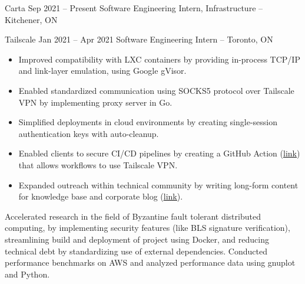 \documentclass{article}
\begin{document}
\normalsize
\WorkEntry
{Carta}
{Sep 2021 -- Present}
{Software Engineering Intern, Infrastructure -- Kitchener, ON}
{
}
\iffalse
Made Tailscale ready for the cloud, by creating features that allowed it to run in lightweight, unprivileged container environments. This included a virtual networking stack for connecting to the Tailscale network without kernel privileges to create a network driver, a SOCKS5 proxy to allow applications to communicate over this virtual networking stack, and ephemeral authentication keys for stateless access to the Tailscale network. Also published long-form technical content on company blog (https://tailscale.com/blog/2021-05-github-actions-and-tailscale/) and contributed to product knowledge base.
\fi
\WorkEntry
{Tailscale}
{Jan 2021 -- Apr 2021}
{Software Engineering Intern -- Toronto, ON}
{\begin{itemize} \itemsep -1pt
    \item Improved compatibility with LXC containers by providing in-process TCP/IP and link-layer emulation, using Google gVisor.
    \item Enabled standardized communication using SOCKS5 protocol over Tailscale VPN by implementing proxy server in Go.
    \item Simplified deployments in cloud environments by creating single-session authentication keys with auto-cleanup.
    \item Enabled clients to secure CI/CD pipelines by creating a GitHub Action (\underline{\href{https://github.com/tailscale/github-action}{link}}) that allows workflows to use Tailscale VPN. %
    \item Expanded outreach within technical community by writing long-form content for knowledge base and corporate blog (\underline{\href{https://tailscale.com/blog/2021-05-github-actions-and-tailscale/}{link}}).
    \end{itemize}}
\vspace{1mm}
\iffalse
Accelerated research in the field of Byzantine fault tolerant distributed computing, by implementing security features (like BLS signature verification), streamlining build and deployment of project using Docker, and reducing technical debt by standardizing use of external dependencies. Conducted performance benchmarks on AWS and analyzed performance data using gnuplot and Python.
\end{document}
